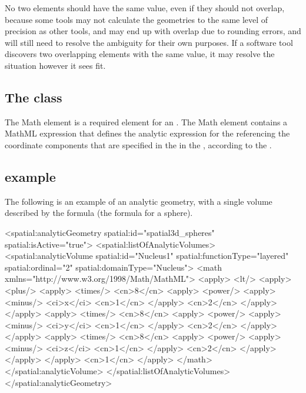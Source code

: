 No two \AnalyticVolume elements should have the same  value, even if they should not overlap, because some tools may not calculate the geometries to the same level of precision as other tools, and may end up with overlap due to rounding errors, and will still need to resolve the ambiguity for their own purposes.  If a software tool discovers two overlapping \AnalyticVolume elements with the same  value, it may resolve the situation however it sees fit.


\subsection{The  class}
\label{math-class}
The Math element is a required element for an \AnalyticVolume. The Math element contains a MathML expression that defines the analytic expression for the \AnalyticVolume referencing the coordinate components that are specified in the \ListOfCoordinateComponents in the \Geometry, according to the . 



\subsection{ example}
\label{analyticvolume-example}
The following is an example of an analytic geometry, with a single volume described by the formula  (the formula for a sphere).

\begin{example}
 <spatial:analyticGeometry spatial:id="spatial3d_spheres" spatial:isActive="true">
   <spatial:listOfAnalyticVolumes>
     <spatial:analyticVolume spatial:id="Nucleus1" spatial:functionType="layered" spatial:ordinal="2"
                             spatial:domainType="Nucleus">
       <math xmlns="http://www.w3.org/1998/Math/MathML">
         <apply> <lt/> <apply> <plus/> <apply> <times/> <cn>8</cn> <apply> <power/> <apply> <minus/>
             <ci>x</ci> <cn>1</cn> </apply> <cn>2</cn> </apply> </apply> <apply> <times/>
             <cn>8</cn> <apply> <power/> <apply> <minus/> <ci>y</ci> <cn>1</cn> </apply> <cn>2</cn>
             </apply> </apply> <apply> <times/> <cn>8</cn> <apply> <power/> <apply> <minus/>
             <ci>z</ci> <cn>1</cn> </apply> <cn>2</cn> </apply> </apply> </apply> <cn>1</cn>
         </apply>
       </math>
     </spatial:analyticVolume>
   </spatial:listOfAnalyticVolumes>
 </spatial:analyticGeometry>
\end{example}

